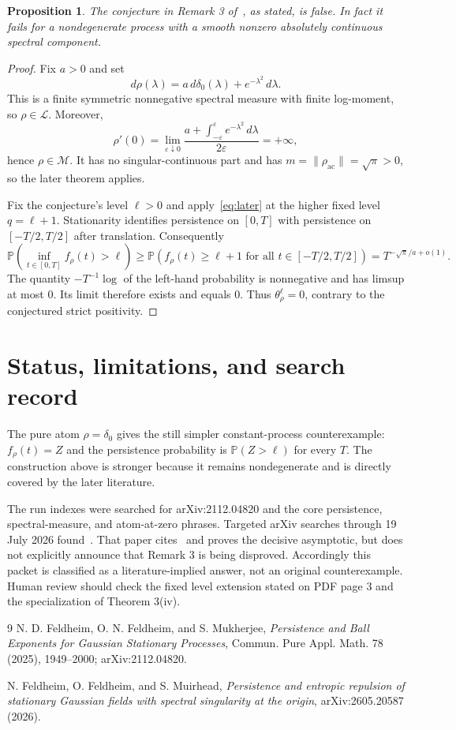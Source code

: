 \documentclass[11pt]{article}
\newtheorem{proposition}{Proposition}
\newcommand{\cL}{\mathcal L}
\newcommand{\cM}{\mathcal M}
\begin{document}
\begin{proposition}
The conjecture in Remark 3 of~\cite{FFM25}, as stated, is false. In fact it
fails for a nondegenerate process with a smooth nonzero absolutely continuous
spectral component.
\end{proposition}

\begin{proof}
Fix $a>0$ and set
\[
 d\rho(\lambda)=a\,d\delta_0(\lambda)+e^{-\lambda^2}\,d\lambda.
\]
This is a finite symmetric nonnegative spectral measure with finite log-moment,
so $\rho\in\cL$. Moreover,
\[
 \rho'(0)=\lim_{\varepsilon\downarrow0}
 \frac{a+\int_{-\varepsilon}^{\varepsilon}e^{-\lambda^2}\,d\lambda}
      {2\varepsilon}=+\infty,
\]
hence $\rho\in\cM$. It has no singular-continuous part and has
$m=\|\rho_{\mathrm{ac}}\|=\sqrt\pi>0$, so the later theorem applies.

Fix the conjecture's level $\ell>0$ and apply~\eqref{eq:later} at the higher
fixed level $q=\ell+1$. Stationarity identifies persistence on $[0,T]$ with
persistence on $[-T/2,T/2]$ after translation. Consequently
\[
 \mathbb P\!\left(\inf_{t\in[0,T]}f_\rho(t)>\ell\right)
 \ge
 \mathbb P\!\left(f_\rho(t)\ge\ell+1
             \text{ for all }t\in[-T/2,T/2]\right)
 =T^{-\sqrt\pi/a+o(1)}.
\]
The quantity $-T^{-1}\log$ of the left-hand probability is nonnegative and
has limsup at most $0$. Its limit therefore exists and equals $0$. Thus
$\theta_\rho^\ell=0$, contrary to the conjectured strict positivity.
\end{proof}

\section{Status, limitations, and search record}

The pure atom $\rho=\delta_0$ gives the still simpler constant-process
counterexample: $f_\rho(t)=Z$ and the persistence probability is
$\mathbb P(Z>\ell)$ for every $T$. The construction above is stronger because
it remains nondegenerate and is directly covered by the later literature.

The run indexes were searched for arXiv:2112.04820 and the core persistence,
spectral-measure, and atom-at-zero phrases. Targeted arXiv searches through
19 July 2026 found~\cite{FFMu26}. That paper cites~\cite{FFM25} and proves the
decisive asymptotic, but does not explicitly announce that Remark 3 is being
disproved. Accordingly this packet is classified as a literature-implied
answer, not an original counterexample. Human review should check the fixed
level extension stated on PDF page 3 and the specialization of Theorem 3(iv).

\begin{thebibliography}{9}
N. D. Feldheim, O. N. Feldheim, and S. Mukherjee,
\emph{Persistence and Ball Exponents for Gaussian Stationary Processes},
Commun. Pure Appl. Math. 78 (2025), 1949--2000;
arXiv:2112.04820.

N. Feldheim, O. Feldheim, and S. Muirhead,
\emph{Persistence and entropic repulsion of stationary Gaussian fields with
spectral singularity at the origin}, arXiv:2605.20587 (2026).
\end{thebibliography}
\end{document}

